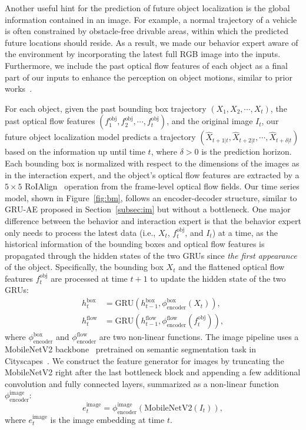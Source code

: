 Another useful hint for the prediction of future object localization is the global information contained in an image. For example, a normal trajectory of a vehicle is often constrained by obstacle-free drivable areas, within which the predicted future locations should reside. As a result, we made our behavior expert aware of the environment by incorporating the latest full RGB image into the inputs. Furthermore, we include the past optical flow features of each object as a final part of our inputs to enhance the perception on object motions, similar to prior works~\citep{fang2022traffic,yao2022dota}.

For each object, given the past bounding box trajectory $(X_1, X_2, \cdots, X_{t})$, the past optical flow features $(f_1^\text{obj}, f_2^\text{obj}, \cdots, f_t^\text{obj})$, and the original image $I_t$, our future object localization model predicts a trajectory $(\hat{X}_{t+1|t}, \hat{X}_{t+2|t}, \cdots, \hat{X}_{t+\delta|t})$ based on the information up until time $t$, where $\delta > 0$ is the prediction horizon. Each bounding box is normalized with respect to the dimensions of the images as in the interaction expert, and the object's optical flow features are extracted by a $5 \times 5$ RoIAlign~\citep{he2017mask} operation from the frame-level optical flow fields. Our time series model, shown in Figure~\ref{fig:bm}, follows an encoder-decoder structure, similar to GRU-AE proposed in Section~\ref{subsec:im} but without a bottleneck. One major difference between the behavior and interaction expert is that the behavior expert only needs to process the latest data (i.e., $X_t$, $f_t^\text{obj}$, and $I_t$) at a time, as the historical information of the bounding boxes and optical flow features is propagated through the hidden states of the two GRUs since \textit{the first appearance} of the object. Specifically, the bounding box $X_t$ and the flattened optical flow features $f_t^\text{obj}$ are processed at time $t+1$ to update the hidden state of the two GRUs:
\begin{equation}
\begin{aligned}
h_t^\text{box} &= \text{GRU} \left(h_{t - 1}^\text{box}, \phi_\text{encoder}^\text{box} (X_t) \right), \\
h_t^\text{flow} &= \text{GRU} \left( h_{t - 1}^\text{flow}, \phi_\text{encoder}^\text{flow} (f_t^\text{obj}) \right),
\end{aligned}
\end{equation}
where $\phi_\text{encoder}^\text{box}$ and $\phi_\text{encoder}^\text{flow}$ are two non-linear functions. The image pipeline uses a MobileNetV2 backbone~\citep{sandler2018mobilenetv2} pretrained on semantic segmentation task in Cityscapes~\citep{cordts2016cityscapes}. We construct the feature generator for images by truncating the MobileNetV2 right after the last bottleneck block and appending a few additional convolution and fully connected layers, summarized as a non-linear function $\phi_\text{encoder}^\text{image}$:
\begin{equation}
e_t^\text{image} = \phi_\text{encoder}^\text{image} \left( \text{MobileNetV2} (I_t) \right),
\end{equation}
where $e_t^\text{image}$ is the image embedding at time $t$.

